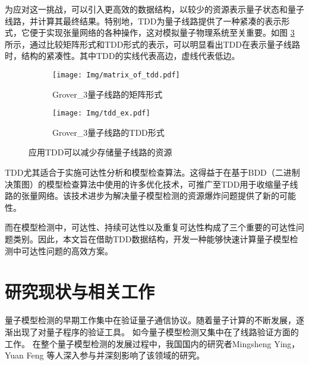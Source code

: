 为应对这一挑战，可以引入更高效的数据结构，以较少的资源表示量子状态和量子线路，并计算其最终结果。特别地，TDD为量子线路提供了一种紧凑的表示形式，它便于实现张量网络的各种操作，这对模拟量子物理系统至关重要。如图 \ref{fig:P} 所示，通过比较矩阵形式和TDD形式的表示，可以明显看出TDD在表示量子线路时，结构的紧凑性。其中TDD的实线代表高边，虚线代表低边。
 	 
\begin{figure}[!htbp]
    \begin{subfigure}[c]{0.45\textwidth}
        \centering
        \texttt{[image: Img/matrix\_of\_tdd.pdf]}
        \caption{Grover\_3量子线路的矩阵形式}
        \label{fig:mat_P}
    \end{subfigure}
    \begin{subfigure}[c]{0.45\textwidth}
        \centering
        \texttt{[image: Img/tdd\_ex.pdf]}
        \caption{Grover\_3量子线路的TDD形式}
        \label{fig:tdd_P}
    \end{subfigure}
    \caption{应用TDD可以减少存储量子线路的资源}
    \label{fig:P}
\end{figure}

TDD尤其适合于实施可达性分析和模型检查算法。这得益于在基于BDD（二进制决策图）的模型检查算法中使用的许多优化技术，可推广至TDD用于收缩量子线路的张量网络\citep{Chaki_2018}。该技术进步为解决量子模型检测的资源爆炸问题提供了新的可能性。

而在模型检测中，可达性、持续可达性以及重复可达性构成了三个重要的可达性问题类别。因此，本文旨在借助TDD数据结构，开发一种能够快速计算量子模型检测中可达性问题的高效方案。

\section{研究现状与相关工作}
量子模型检测的早期工作集中在验证量子通信协议。随着量子计算的不断发展，逐渐出现了对量子程序的验证工具。
如今量子模型检测又集中在了线路验证方面的工作。
在整个量子模型检测的发展过程中，我国国内的研究者Mingsheng Ying， Yuan Feng 等人深入参与并深刻影响了该领域的研究。

